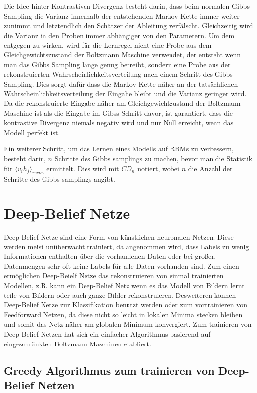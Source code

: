 \documentclass[12pt]{article}
\begin{document}
Die Idee hinter Kontrastiven Divergenz besteht darin, dass beim normalen Gibbs Sampling die Varianz innerhalb der entstehenden Markov-Kette immer weiter zunimmt und letztendlich den Schätzer der Ableitung verfälscht. Gleichzeitig wird die Varianz in den Proben immer abhängiger von den Parametern. Um dem entgegen zu wirken, wird für die Lernregel nicht eine Probe aus dem Gleichgewichtszustand der Boltzmann Maschine verwendet, der entsteht wenn man das Gibbs Sampling lange genug betreibt, sondern eine Probe aus der rekonstruierten Wahrscheinlichkeitsverteilung nach einem Schritt des Gibbs Sampling. Dies sorgt dafür dass die Markov-Kette näher an der tatsächlichen Wahrscheinlichkeitsverteilung der Eingabe bleibt und die Varianz geringer wird. Da die rekonstruierte Eingabe näher am Gleichgewichtzustand der Boltzmann Maschine ist als die Eingabe im Gibss Schritt davor, ist garantiert, dass die kontrastive Divergenz niemals negativ wird und nur Null erreicht, wenn das Modell perfekt ist. \cite{digits}

Ein weiterer Schritt, um das Lernen eines Modells auf RBMs zu verbessern, besteht darin, $n$ Schritte des Gibbs samplings zu machen, bevor man die Statistik für $\langle v_i h_j \rangle_{recon}$ ermittelt. Dies wird mit $CD_n$ notiert, wobei $n$ die Anzahl der Schritte des Gibbs samplings angibt.

\section{Deep-Belief Netze}
Deep-Belief Netze sind eine Form von künstlichen neuronalen Netzen. Diese werden meist unüberwacht trainiert, da angenommen wird, dass Labels zu wenig Informationen enthalten über die vorhandenen Daten oder bei großen Datenmengen sehr oft keine Labels für alle Daten vorhanden sind. Zum einen ermöglichen Deep-Beielf Netze das rekonstruieren von einmal trainierten Modellen, z.B. kann ein Deep-Belief Netz wenn es das Modell von Bildern lernt teile von Bildern oder auch ganze Bilder rekonstruieren. Desweiteren können Deep-Belief Netze zur Klassifikation benutzt werden oder zum vortrainieren von Feedforward Netzen, da diese nicht so leicht in lokalen Minima stecken bleiben und somit das Netz näher am globalen Minimum konvergiert. Zum trainieren von Deep-Belief Netzen hat sich ein einfacher Algorithmus basierend auf eingeschränkten Boltzmann Maschinen etabliert.

\subsection{Greedy Algorithmus zum trainieren von Deep-Belief Netzen}
\end{document}
